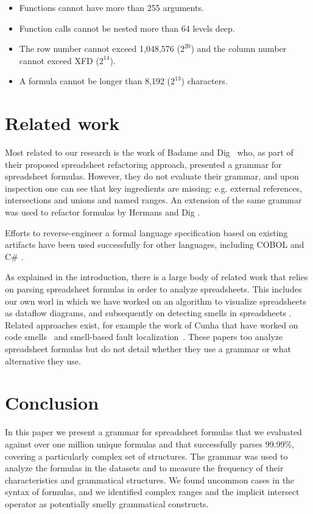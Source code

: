 \documentclass[conference]{IEEEtran}
\begin{document}
\begin{itemize}
	\item Functions cannot have more than 255 arguments.
	\item Function calls cannot be nested more than 64 levels deep.
	\item The row number cannot exceed 1,048,576 ($2^{20}$) and the column number cannot exceed XFD ($2^{14}$).
	\item A formula cannot be longer than 8,192 ($2^{13}$) characters.
\end{itemize}

\section{Related work}
\label{section:relatedWork}
Most related to our research is the work of Badame and Dig~\cite{badame2012refactoring} who, as part of their proposed spreadsheet refactoring approach, presented a grammar for spreadsheet formulas. However, they do not evaluate their grammar, and upon inspection one can see that key ingredients are missing: e.g. external references, intersections and unions and named ranges. An extension of the same grammar was used to refactor formulas by Hermans and Dig \cite{hermans2014bumblebee}.

Efforts to reverse-engineer a formal language specification based on existing artifacts have been used successfully for other languages, including COBOL \cite{van1997obtaining} and C\# \cite{zaytsev2010recovery}.

As explained in the introduction, there is a large body of related work that relies on parsing spreadsheet formulas in order to analyze spreadsheets. This includes our own worl in which we have worked on an algorithm to visualize spreadsheets as dataflow diagrams\cite{DBLP:conf/icse/HermansPD11}, and subsequently on detecting smells in spreadsheets \cite{DBLP:conf/icse/HermansPD12,DBLP:conf/icsm/Hermans212}. Related approaches exist, for example the work of Cunha that have worked on code smells~\cite{iccsa12} and smell-based fault localization~\cite{conf/icsme/CunhaFMPS14}. These papers too analyze spreadsheet formulas but do not detail whether they use a grammar or what alternative they use.

\section{Conclusion}
\label{section:conclusion}

In this paper we present a grammar for spreadsheet formulas that we evaluated against over one million unique formulas and that successfully parses 99.99\%, covering a particularly complex set of structures. The grammar was used to analyze the formulas in the datasets and to measure the frequency of their characteristics and grammatical structures. We found uncommon cases in the syntax of formulas, and we identified complex ranges and the implicit intersect operator as potentially smelly grammatical constructs.
\end{document}
